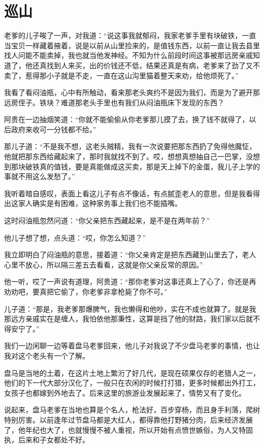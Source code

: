 \chapter{巡山}

老爹的儿子唉了一声，对我道：“说这事我就郁闷，我家老爹手里有块破铁，一直当宝贝一样藏着掖着，说是以前从山里捡来的，是值钱东西，以前一直让我去县里找人问能不能卖掉，我也就当他发神经。不知为什么前段时间这事被那远房亲戚知道了，他还真找到人来买，出的价钱还不低，结果还真是有病，老爹来了劲了又不卖了，惹得那小子就是不走，一直在这山沟里猫着整天来劝，给他烦死了。”

我看了看闷油瓶，心中有所触动，看来那老头爽约不是因为我们，而是为了避开那远房侄子。铁块？难道那老头手里也有我们从闷油瓶床下发现的东西？

阿贵在一边抽烟笑道：“你就不能偷偷从你老爹那儿摸了去，换了钱不就得了，以后政府来收可一分钱都不给。”

那儿子道：“不是我不想，这老头贼精，我有一次说要把那东西扔了免得他魔怔，他就把那东西给藏起来了，那时我就找不到了。哎，想想真想抽自己一巴掌，没想到那块破铁真的值钱，要是真能做成这买卖，那是天上掉下的金蛋，我儿子上学的事就不用这么发愁了。”

我听着暗自感叹，表面上看这儿子有点不像话，有点腻歪老人的意思，但是我看得出这家人确实是有困难，这种家务事上我们也不能插嘴。

这时闷油瓶忽然问道：“你父亲把东西藏起来，是不是在两年前？”

他儿子想了想，点头道：“哎，你怎么知道？”

我立即明白了闷油瓶的意思，接着道：“你父亲肯定是把东西藏到山里去了，老人心里不放心，所以隔三差五去看看，这就是你父亲反常的原因。”

他一听，哎了一声说有道理，阿贵道：“那你老爹对这事还真上了心了，你还是再劝劝吧，要真把它偷了，你老爹非拿枪毙了你不可。”

儿子道：“那是，我老爹那爆脾气，我也懒得和他吵，实在不成也就算了。就是我那远方亲戚实在是缠人，我怕依他那秉性，这算是挡了他的财路，我们家以后就不得安宁了。”

我们一边闲聊一边等着盘马老爹回来，他儿子对我说了不少盘马老爹的事情，也让我对这个老头有一个了解。

盘马是当地的土着，在这片土地上繁洐了好几代，是现在硕果仅存的老猎人之一，他们的下一代大部分汉化了，一般只在农闲的时候打打猎，更多时候都出外打工，女孩子也都嫁到外地去了。后来这里的旅游业发展起来了，情势又有了变化。

说起来，盘马老爹在当地也算是个名人，枪法好，百步穿杨，而且身手利落，爬树特别厉害。以前逢年过节盘马都是大红人，都得靠他打野猪分肉，后来经济发展了，他年纪也大了，也就慢慢不被人重视，所以开始有点愤世嫉俗，为人又特固执，后来和子女都处不好。

